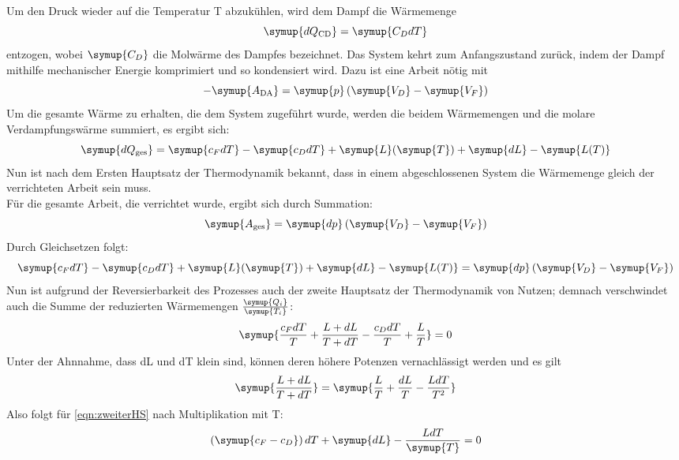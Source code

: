 Um den Druck wieder auf die Temperatur T abzukühlen, wird dem Dampf die Wärmemenge
\begin{equation}
\symup{dQ_\text{CD}} = \symup{C_D dT}
\end{equation}
entzogen, wobei $\symup{C_D}$ die Molwärme des Dampfes bezeichnet. Das System kehrt zum Anfangszustand
zurück, indem der Dampf mithilfe mechanischer Energie komprimiert und so kondensiert wird. Dazu ist 
eine Arbeit nötig mit
\begin{equation}
- \symup{A_{\text{DA}}} = \symup{p} \left( \symup{V_D} - \symup{V_F} \right)
\end{equation}
Um die gesamte Wärme zu erhalten, die dem System zugeführt wurde, werden die beidem Wärmemengen und
die molare Verdampfungswärme summiert, es ergibt sich:
\begin{equation}
\symup{dQ_\text{ges}} = \symup{c_F dT} - \symup{c_D dT} + \symup{L}(\symup{T}) + \symup{dL} - \symup{L(T)}
\end{equation}
Nun ist nach dem Ersten Hauptsatz der Thermodynamik bekannt, dass in einem abgeschlossenen System die Wärmemenge gleich der verrichteten Arbeit 
sein muss.\\
Für die gesamte Arbeit, die verrichtet wurde, ergibt sich durch Summation:
\begin{equation}
\symup{A_\text{ges}} = \symup{dp} \left( \symup{V_D} - \symup{V_F} \right)
\end{equation}
Durch Gleichsetzen folgt:
\begin{equation}
\symup{c_F dT} - \symup{c_D dT} + \symup{L}(\symup{T}) + \symup{dL} - \symup{L(T)} = \symup{dp} \left( \symup{V_D} - \symup{V_F} \right)
\label{eqn:ersterHS}
\end{equation}
Nun ist aufgrund der Reversierbarkeit des Prozesses auch der zweite Hauptsatz der
Thermodynamik von Nutzen; demnach verschwindet auch die Summe der reduzierten
Wärmemengen $\frac{\symup{Q_i}}{\symup{T_i}}$:
\begin{equation}
\symup{\frac{c_F dT}{T} + \frac{L + dL}{T + dT} - \frac{c_D dT}{T} + \frac{L}{T}} = 0
\label{eqn:zweiterHS}
\end{equation}
Unter der Ahnnahme, dass dL und dT klein sind, können deren höhere Potenzen 
vernachlässigt werden und es gilt
\begin{equation}
\symup{\frac{L + dL}{T + dT}} = \symup{\frac{L}{T} + \frac{dL}{T} - \frac{L dT}{T^2}}
\end{equation}
Also folgt für \eqref{eqn:zweiterHS} nach Multiplikation mit T:
\begin{equation}
\left( \symup{c_F - c_D} \right) dT + \symup{dL} - \frac{L dT}{\symup{T}} = 0
\end{equation}
